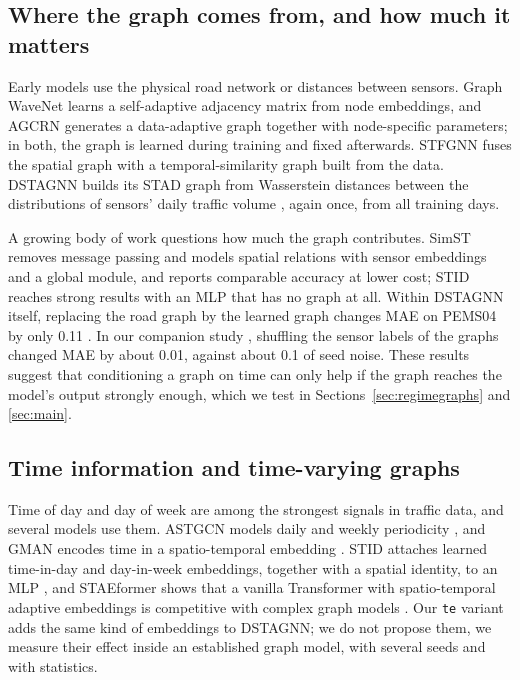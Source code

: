 \documentclass[conference]{IEEEtran}
\begin{document}
\subsection{Where the graph comes from, and how much it matters}\label{sec:ls-b}
Early models use the physical road network or distances between sensors. Graph WaveNet \cite{wu2019gwnet} learns a self-adaptive adjacency matrix from node embeddings, and AGCRN \cite{bai2020agcrn} generates a data-adaptive graph together with node-specific parameters; in both, the graph is learned during training and fixed afterwards. STFGNN \cite{li2021stfgnn} fuses the spatial graph with a temporal-similarity graph built from the data. DSTAGNN builds its STAD graph from Wasserstein distances between the distributions of sensors' daily traffic volume \cite{lan2022dstagnn,panaretos2019}, again once, from all training days.

A growing body of work questions how much the graph contributes. SimST \cite{liu2023simst} removes message passing and models spatial relations with sensor embeddings and a global module, and reports comparable accuracy at lower cost; STID \cite{shao2022stid} reaches strong results with an MLP that has no graph at all. Within DSTAGNN itself, replacing the road graph by the learned graph changes MAE on PEMS04 by only 0.11 \cite{lan2022dstagnn}. In our companion study \cite{companion}, shuffling the sensor labels of the graphs changed MAE by about 0.01, against about 0.1 of seed noise. These results suggest that conditioning a graph on time can only help if the graph reaches the model's output strongly enough, which we test in Sections~\ref{sec:regimegraphs} and \ref{sec:main}.

\subsection{Time information and time-varying graphs}\label{sec:ls-c}
Time of day and day of week are among the strongest signals in traffic data, and several models use them. ASTGCN models daily and weekly periodicity \cite{guo2019astgcn}, and GMAN encodes time in a spatio-temporal embedding \cite{zheng2020gman}. STID attaches learned time-in-day and day-in-week embeddings, together with a spatial identity, to an MLP \cite{shao2022stid}, and STAEformer shows that a vanilla Transformer with spatio-temporal adaptive embeddings is competitive with complex graph models \cite{liu2023staeformer}. Our \texttt{te} variant adds the same kind of embeddings to DSTAGNN; we do not propose them, we measure their effect inside an established graph model, with several seeds and with statistics.
\end{document}
